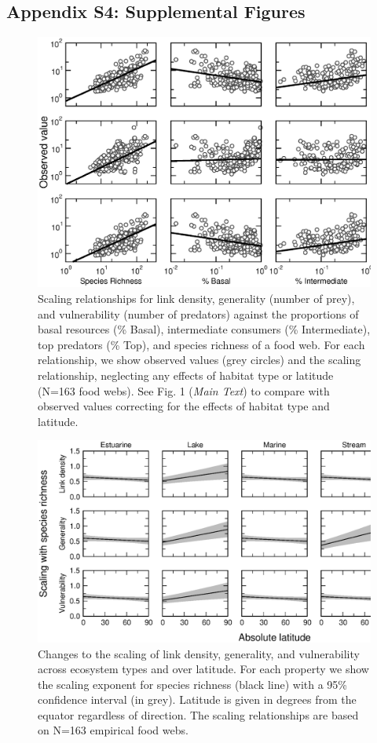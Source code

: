 \documentclass[12pt]{article}
\begin{document}
\newpage

\subsection*{Appendix S4: Supplemental Figures}

\begin{figure}[h]
\centerline{\includegraphics*[width=.75\textwidth]{Figures/by_TL/scaling_with_S/proportions/fitlines_nonts_observed.eps}}
\caption{Scaling relationships for link density, generality (number of prey), 
and vulnerability (number of predators) against the proportions of basal resources (\% Basal),
intermediate consumers (\% Intermediate), top predators (\% Top), and species richness of a food web. 
For each relationship, we show observed values (grey circles) and the scaling relationship, neglecting 
any effects of habitat type or latitude (N=163 food webs). See Fig. 1 (\emph{Main Text}) to compare with 
observed values correcting for the effects of habitat type and latitude. }
\label{props_v_lat_obs}
\end{figure}

\newpage


\begin{figure}[h]
\centerline{\includegraphics*[width=.8\textwidth]{Figures/by_TL/marginal/S_marginal_latitude_proportions.eps}}
\caption{Changes to the scaling of link density, generality, and vulnerability across ecosystem
types and over latitude. For each property we show the scaling exponent for species richness (black
line) with a 95\% confidence interval (in grey). Latitude is given in degrees from the equator
regardless of direction. The scaling relationships are based on N=163 empirical food webs.}
\label{S}
\end{figure}
\end{document}
